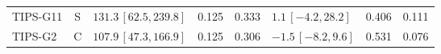 \begin{longtable}{lcp{37mm}rrp{37mm}rr}
TIPS-G11 & S & \(131.3\,[62.5,239.8]\) & 0.125 & 0.333 & \(1.1\,[-4.2,28.2]\) & 0.406 & 0.111\\
TIPS-G2 & C & \(107.9\,[47.3,166.9]\) & 0.125 & 0.306 & \(-1.5\,[-8.2,9.6]\) & 0.531 & 0.076\\

\end{longtable}
